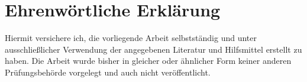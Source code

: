 \newpage
\section*{Ehrenwörtliche  Erklärung}
\thispagestyle{empty}

Hiermit versichere ich, die vorliegende Arbeit selbstständig und unter ausschließlicher Verwendung der angegebenen Literatur und Hilfsmittel erstellt zu haben.\newline
Die Arbeit wurde bisher in gleicher oder ähnlicher Form keiner anderen Prüfungsbehörde vorgelegt und auch nicht veröffentlicht.
\vspace{1cm}
\signature{Ludwigsburg}

 